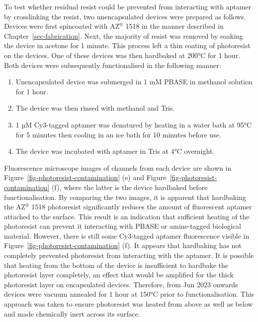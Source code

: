 \documentclass[
  a4paper,
]{scrbook}
\begin{document}
To test whether residual resist could be prevented from interacting with
aptamer by crosslinking the resist, two unencapsulated devices were
prepared as follows. Devices were first spincoated with AZ\(^\circledR\)
1518 in the manner described in Chapter~\ref{sec-fabrication}. Next, the
majority of resist was removed by soaking the device in acetone for 1
minute. This process left a thin coating of photoresist on the devices.
One of these devices was then hardbaked at 200°C for 1 hour. Both
devices were subsequently functionalised in the following manner:

\begin{enumerate}
\def\labelenumi{\arabic{enumi}.}
\item
  Unencapsulated device was submerged in 1 mM PBASE in methanol solution
  for 1 hour.
\item
  The device was then rinsed with methanol and Tris.
\item
  1 µM Cy3-tagged aptamer was denatured by heating in a water bath at
  95°C for 5 minutes then cooling in an ice bath for 10 minutes before
  use.
\item
  The device was incubated with aptamer in Tris at 4°C overnight.
\end{enumerate}

Fluorescence microscope images of channels from each device are shown in
Figure~\ref{fig-photoresist-contamination} (e) and
Figure~\ref{fig-photoresist-contamination} (f), where the latter is the
device hardbaked before functionalisation. By comparing the two images,
it is apparent that hardbaking the AZ\(^\circledR\) 1518 photoresist
significantly reduces the amount of fluorescent aptamer attached to the
surface. This result is an indication that sufficient heating of the
photoresist can prevent it interacting with PBASE or amine-tagged
biological material. However, there is still some Cy3-tagged aptamer
fluorescence visible in Figure~\ref{fig-photoresist-contamination} (f).
It appears that hardbaking has not completely prevented photoresist from
interacting with the aptamer. It is possible that heating from the
bottom of the device is insufficient to hardbake the photoresist layer
completely, an effect that would be amplified for the thick photoresist
layer on encapsulated devices. Therefore, from Jun 2023 onwards devices
were vacuum annealed for 1 hour at 150°C prior to functionalisation.
This approach was taken to ensure photoresist was heated from above as
well as below and made chemically inert across its surface.
\end{document}
